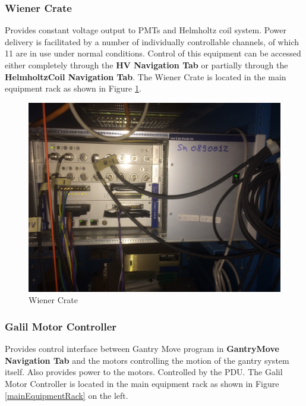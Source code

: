 \documentclass[twoside,letterpaper]{refart}
\begin{document}
\FloatBarrier

\subsubsection{Wiener Crate}

Provides constant voltage output to PMTs and Helmholtz coil system.  Power delivery is facilitated by a number of individually controllable channels, of which 11 are in use under normal conditions. Control of this equipment can be accessed either completely through the \textbf{HV Navigation Tab} or partially through the \textbf{HelmholtzCoil Navigation Tab}.  The Wiener Crate is located in the main equipment rack as shown in Figure \ref{wiener}.

\FloatBarrier

\begin{figure}[!htpb] 
	\centering	
	\includegraphics[scale=0.07]{images/wiener}
	\caption{Wiener Crate}
	\label{wiener}
\end{figure}

\FloatBarrier

\clearpage

\subsubsection{Galil Motor Controller}

Provides control interface between Gantry Move program in \textbf{GantryMove Navigation Tab} and the motors controlling the motion of the gantry system itself.  Also provides power to the motors.  Controlled by the PDU. The Galil Motor Controller is located in the main equipment rack as shown in Figure \ref{mainEquipmentRack} on the left.
\end{document}
